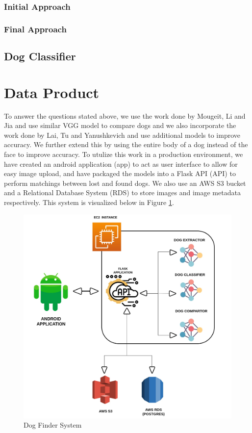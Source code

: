 \documentclass{article}
\begin{document}
\subsubsection{Initial Approach}

\subsubsection{Final Approach}

\subsection{Dog Classifier}


\section{Data Product}

To answer the questions stated above, we use the work done by Mougeit, Li and Jia and use similar VGG model to compare dogs and we also incorporate the work done by Lai, Tu and Yanushkevich and use additional models to improve accuracy.  We further extend this by using the entire body of a dog instead of the face to improve accuracy.  To utulize this work in a production environment, we have created an android application (app) to act as user interface to allow for easy image upload, and have packaged the models into a Flask API (API) to perform matchings between lost and found dogs. We also use an AWS S3 bucket and a Relational Database System (RDS) to store images and image metadata respectively.  This system is visualized below in Figure \ref{fig:x app system}.

\begin{figure}[h]
\centering
	\includegraphics[scale=0.1]{final-report-images/system.jpeg}
\caption{Dog Finder System}
\label{fig:x app system}
\end{figure}
\end{document}
